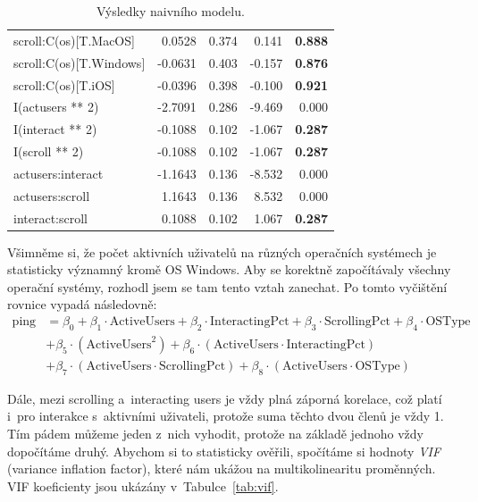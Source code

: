 \documentclass[a4paper, 11pt]{article}
\begin{document}
\begin{table}[ht]
\begin{tabularx}{0.8\textwidth}{lRRRR}
            scroll:C(os)[T.MacOS]        & 0.0528  & 0.374 & 0.141  & \textbf{0.888} \\
            scroll:C(os)[T.Windows]      & -0.0631 & 0.403 & -0.157 & \textbf{0.876} \\
            scroll:C(os)[T.iOS]          & -0.0396 & 0.398 & -0.100 & \textbf{0.921} \\
            I(actusers ** 2)             & -2.7091 & 0.286 & -9.469 & 0.000  \\
            I(interact ** 2)             & -0.1088 & 0.102 & -1.067 & \textbf{0.287} \\
            I(scroll ** 2)               & -0.1088 & 0.102 & -1.067 & \textbf{0.287} \\
            actusers:interact            & -1.1643 & 0.136 & -8.532 & 0.000  \\
            actusers:scroll              & 1.1643  & 0.136 & 8.532  & 0.000 \\
            interact:scroll              & 0.1088  & 0.102 & 1.067  & \textbf{0.287} \\
            \bottomrule
        \end{tabularx}
    \caption{Výsledky naivního modelu.}
    \label{tab:ols_results}
    \end{table}

Všimněme si, že počet aktivních uživatelů na různých operačních systémech je statisticky významný kromě OS Windows.
Aby se korektně započítávaly všechny operační systémy, rozhodl jsem se tam tento vztah zanechat.
Po tomto vyčištění rovnice vypadá následovně:
\begin{align*}
    \text{ping} &=\beta_0 + \beta_1 \cdot \text{ActiveUsers} + \beta_2 \cdot \text{InteractingPct} + \beta_3 \cdot \text{ScrollingPct} + \beta_4 \cdot \text{OSType}  \\
    &+ \beta_5 \cdot (\text{ActiveUsers}^2) + \beta_6 \cdot (\text{ActiveUsers} \cdot \text{InteractingPct}) \\
    &+ \beta_7 \cdot (\text{ActiveUsers} \cdot \text{ScrollingPct}) + \beta_8 \cdot (\text{ActiveUsers} \cdot \text{OSType})
\end{align*}

Dále, mezi scrolling a~interacting users je vždy plná záporná korelace, což platí i~pro interakce s~aktivními uživateli, protože suma těchto dvou členů je vždy 1.
Tím pádem můžeme jeden z~nich vyhodit, protože na základě jednoho vždy dopočítáme druhý.
Abychom si to statisticky ověřili, spočítáme si hodnoty \emph{VIF} (variance inflation factor), které nám ukážou na multikolinearitu proměnných.
VIF koeficienty jsou ukázány v~Tabulce~\ref{tab:vif}.
\end{document}
